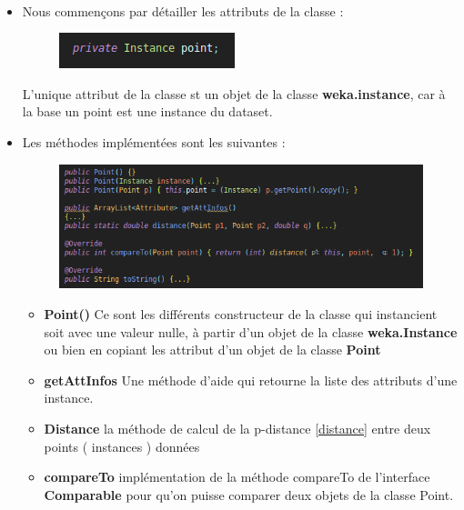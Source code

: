 		\paragraph{}
		\begin{itemize}
			\item Nous commençons par détailler les attributs de la classe : 
			\begin{figure}[H]
				\centering
				\includegraphics[width=0.75\linewidth]{dbscan/images/point/props.png}
			\end{figure}
			\par L'unique attribut de la classe st un objet de la classe \textbf{weka.instance}, car à la base un point est une instance du dataset.
			
			\item Les méthodes implémentées sont les suivantes : 
			\begin{figure}[H]
				\centering
				\includegraphics[width=0.75\linewidth]{dbscan/images/point/meths.png}
				
			\end{figure}
			\begin{itemize}
				\item \textbf{Point()} Ce sont les différents constructeur de la classe qui instancient soit avec une valeur nulle, à partir d'un objet de la classe \textbf{weka.Instance} ou bien en copiant les attribut d'un objet de la classe \textbf{Point}
				\item \textbf{getAttInfos} Une méthode d'aide qui retourne la liste des attributs d'une instance.
				\item \textbf{Distance} la méthode de calcul de la p-distance \ref{distance} entre deux points ( instances ) données
				\item \textbf{compareTo} implémentation de la méthode compareTo de l'interface \textbf{Comparable} pour qu'on puisse comparer deux objets de la classe Point.
			\end{itemize}
			
		\end{itemize}
